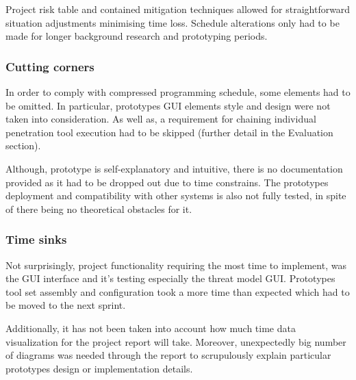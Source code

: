 		Project risk table and contained mitigation techniques allowed for straightforward situation adjustments minimising time loss. Schedule alterations only had to be made for longer background research and prototyping periods.
		
		\subsubsection{Cutting corners}
		In order to comply with compressed programming schedule, some elements had to be omitted. In particular, prototypes GUI elements style and design were not taken into consideration. As well as, a requirement for chaining individual penetration tool execution had to be skipped (further detail in the Evaluation section). 
		
		Although, prototype is self-explanatory and intuitive, there is no documentation provided as it had to be dropped out due to time constrains. The prototypes deployment and compatibility with other systems is also not fully tested, in spite of there being no theoretical obstacles for it. 
		
		\subsubsection{Time sinks}
		Not surprisingly, project functionality requiring the most time to implement, was the GUI interface and it's testing especially the threat model GUI. Prototypes tool set assembly and configuration took a more time than expected which had to be moved to the next sprint. 
		
		Additionally, it has not been taken into account how much time data visualization for the project report will take. Moreover, unexpectedly big number of diagrams was needed through the report to scrupulously explain particular prototypes design or implementation details. 
